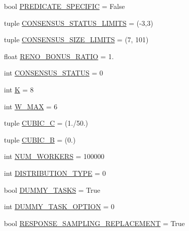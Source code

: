 \begin{DoxyCompactItemize}
\item 
bool \mbox{\hyperlink{namespacedynamicfilterapp_1_1toggles_a2826a54e707f46fbd0fa2f8f6219ead7}{P\+R\+E\+D\+I\+C\+A\+T\+E\+\_\+\+S\+P\+E\+C\+I\+F\+IC}} = False
\item 
tuple \mbox{\hyperlink{namespacedynamicfilterapp_1_1toggles_a36cac18f3d673a6f2cd86c88127e41b9}{C\+O\+N\+S\+E\+N\+S\+U\+S\+\_\+\+S\+T\+A\+T\+U\+S\+\_\+\+L\+I\+M\+I\+TS}} = (-\/3,3)
\item 
tuple \mbox{\hyperlink{namespacedynamicfilterapp_1_1toggles_a1a20e4a8af9569eaef5eb5b23f07222b}{C\+O\+N\+S\+E\+N\+S\+U\+S\+\_\+\+S\+I\+Z\+E\+\_\+\+L\+I\+M\+I\+TS}} = (7, 101)
\item 
float \mbox{\hyperlink{namespacedynamicfilterapp_1_1toggles_a18fd240c30a7c4a6ee9df12436a744ab}{R\+E\+N\+O\+\_\+\+B\+O\+N\+U\+S\+\_\+\+R\+A\+T\+IO}} = 1.
\item 
int \mbox{\hyperlink{namespacedynamicfilterapp_1_1toggles_a090eab76b7b0e234f422b87e30adf793}{C\+O\+N\+S\+E\+N\+S\+U\+S\+\_\+\+S\+T\+A\+T\+US}} = 0
\item 
int \mbox{\hyperlink{namespacedynamicfilterapp_1_1toggles_a2689c4b3931025b79053532a5f1b0a85}{K}} = 8
\item 
int \mbox{\hyperlink{namespacedynamicfilterapp_1_1toggles_add63171ca968cbd5ca4d60dfbf9a2746}{W\+\_\+\+M\+AX}} = 6
\item 
tuple \mbox{\hyperlink{namespacedynamicfilterapp_1_1toggles_a073a7aa1bc6b8c92d5682922759765fd}{C\+U\+B\+I\+C\+\_\+C}} = (1./50.)
\item 
tuple \mbox{\hyperlink{namespacedynamicfilterapp_1_1toggles_a2d4f2e30d34616c754114da7b5c88000}{C\+U\+B\+I\+C\+\_\+B}} = (0.)
\item 
int \mbox{\hyperlink{namespacedynamicfilterapp_1_1toggles_a806fc12166c09fa5baabfcbe218040ae}{N\+U\+M\+\_\+\+W\+O\+R\+K\+E\+RS}} = 100000
\item 
int \mbox{\hyperlink{namespacedynamicfilterapp_1_1toggles_aceed21fa0675802d2f756c7da43cb049}{D\+I\+S\+T\+R\+I\+B\+U\+T\+I\+O\+N\+\_\+\+T\+Y\+PE}} = 0
\item 
bool \mbox{\hyperlink{namespacedynamicfilterapp_1_1toggles_a16edb4f07d82f0494347a0977663e6f4}{D\+U\+M\+M\+Y\+\_\+\+T\+A\+S\+KS}} = True
\item 
int \mbox{\hyperlink{namespacedynamicfilterapp_1_1toggles_a0b87eab5c4f4f0b986a43805f825d2c6}{D\+U\+M\+M\+Y\+\_\+\+T\+A\+S\+K\+\_\+\+O\+P\+T\+I\+ON}} = 0
\item 
bool \mbox{\hyperlink{namespacedynamicfilterapp_1_1toggles_a1f569cdee80dfd4d7a2d7a3f3aebc47f}{R\+E\+S\+P\+O\+N\+S\+E\+\_\+\+S\+A\+M\+P\+L\+I\+N\+G\+\_\+\+R\+E\+P\+L\+A\+C\+E\+M\+E\+NT}} = True

\end{DoxyCompactItemize}
